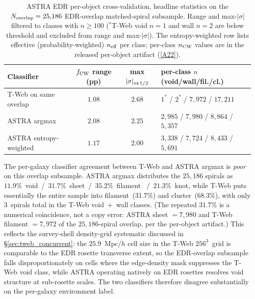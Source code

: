 \documentclass[aps,prd,twocolumn,superscriptaddress,showpacs,preprintnumbers,nofootinbib,longbibliography,floatfix]{revtex4-2}
\newcommand{\repoBase}{https://github.com/Hubify-Projects/bigbounce/blob/main}
\begin{document}
\begin{table}[!htb]
\caption{ASTRA EDR per-object cross-validation, headline statistics on
the $N_{\rm overlap} = 25{,}186$ EDR-overlap matched-spiral subsample.
Range and max-$|\sigma|$ filtered to classes with $n \geq 100$
($^*$T-Web void $n=1$ and wall $n=2$ are below threshold and excluded
from range and max-$|\sigma|$). The entropy-weighted row lists
effective (probability-weighted) $n_{\rm eff}$ per class; per-class
$n_{\rm CW}$ values are in the released per-object artifact
(\href{\repoBase/pipelines/p5\_desi\_chirality/results/analysis\_astra\_per\_object/cw\_fraction\_by\_env\_astra.csv}{[A22]}).}
\label{tab:astra_headline}
\centering
\begin{ruledtabular}
\begin{tabular}{lccl}
Classifier & $f_{\rm CW}$ range (pp) & max $|\sigma|_{\rm vs\,1/2}$ &
per-class $n$ (void/wall/fil./cl.) \\
\hline
T-Web on same overlap         & $1.08$ & $2.68$ & $1^*$ / $2^*$ / $7{,}972$ / $17{,}211$ \\
ASTRA argmax                  & $2.08$ & $2.25$ & $2{,}985$ / $7{,}980$ / $8{,}864$ / $5{,}357$ \\
ASTRA entropy-weighted        & $1.17$ & $2.00$ & $3{,}338$ / $7{,}724$ / $8{,}433$ / $5{,}691$ \\
\end{tabular}
\end{ruledtabular}
\end{table}

The per-galaxy classifier agreement between T-Web and ASTRA argmax is
\emph{poor} on this overlap subsample. ASTRA argmax distributes the
$25{,}186$ spirals as $11.9\%$~void~/~$31.7\%$~sheet~/~$35.2\%$~filament
~/~$21.3\%$~knot, while T-Web puts essentially the entire sample into
filament~(31.7\%) and cluster~(68.3\%), with only $3$~spirals total in
the T-Web void~$+$~wall classes. (The repeated $31.7\%$ is a
numerical coincidence, not a copy error: ASTRA sheet $= 7{,}980$ and
T-Web filament $= 7{,}972$ of the $25{,}186$-spiral overlap, per the
per-object artifact.) This reflects the survey-shell
density-grid systematic discussed in
\S\ref{sec:tweb_concurrent}: the $25.9$~Mpc/$h$ cell size in the T-Web
$256^{3}$~grid is comparable to the EDR rosette transverse extent, so
the EDR-overlap subsample falls disproportionately on cells where the
edge-density mask suppresses the T-Web void class, while ASTRA
operating natively on EDR rosettes resolves void structure at
sub-rosette scales. The two classifiers therefore disagree
substantially on the per-galaxy environment label.
\end{document}
